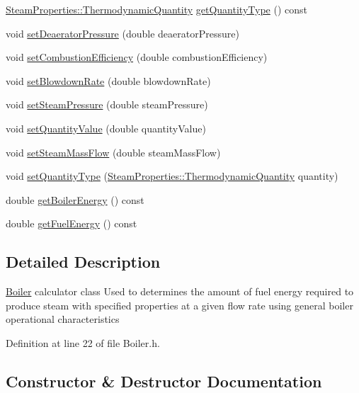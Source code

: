 \begin{DoxyCompactItemize}
\item 
\hyperlink{class_steam_properties_ae0294bedf7d178c2d8fb6aed0f62fbff}{Steam\+Properties\+::\+Thermodynamic\+Quantity} \hyperlink{class_boiler_a26a71f789c9f9e05bd43a1ca0219f920}{get\+Quantity\+Type} () const
\item 
void \hyperlink{class_boiler_a56f422254606ebba1248ae0b4f8f0215}{set\+Deaerator\+Pressure} (double deaerator\+Pressure)
\item 
void \hyperlink{class_boiler_abef6bc48101f98f0650cb07fb1d51f74}{set\+Combustion\+Efficiency} (double combustion\+Efficiency)
\item 
void \hyperlink{class_boiler_a66c0e4c577dbd3f52dcf202e69a08371}{set\+Blowdown\+Rate} (double blowdown\+Rate)
\item 
void \hyperlink{class_boiler_a0a4619ff73c9969daebe3aa66ddad6be}{set\+Steam\+Pressure} (double steam\+Pressure)
\item 
void \hyperlink{class_boiler_ac3450d88dba124529d59baf62c39e14a}{set\+Quantity\+Value} (double quantity\+Value)
\item 
void \hyperlink{class_boiler_ada7af5896a2a4701d78a532dc9bc9892}{set\+Steam\+Mass\+Flow} (double steam\+Mass\+Flow)
\item 
void \hyperlink{class_boiler_a9c5b20cae6133c9174b12760f36d52c2}{set\+Quantity\+Type} (\hyperlink{class_steam_properties_ae0294bedf7d178c2d8fb6aed0f62fbff}{Steam\+Properties\+::\+Thermodynamic\+Quantity} quantity)
\item 
double \hyperlink{class_boiler_a8cc9ad5f1b36f5dcbcb225e9e3d13a39}{get\+Boiler\+Energy} () const
\item 
double \hyperlink{class_boiler_a55542a761669c842163b20932f9747d3}{get\+Fuel\+Energy} () const
\end{DoxyCompactItemize}


\subsection{Detailed Description}
\hyperlink{class_boiler}{Boiler} calculator class Used to determines the amount of fuel energy required to produce steam with specified properties at a given flow rate using general boiler operational characteristics 

Definition at line 22 of file Boiler.\+h.



\subsection{Constructor \& Destructor Documentation}
\mbox{\label{class_boiler_adebe1dca06edc8dbca462e226b4dd9d5}} 
